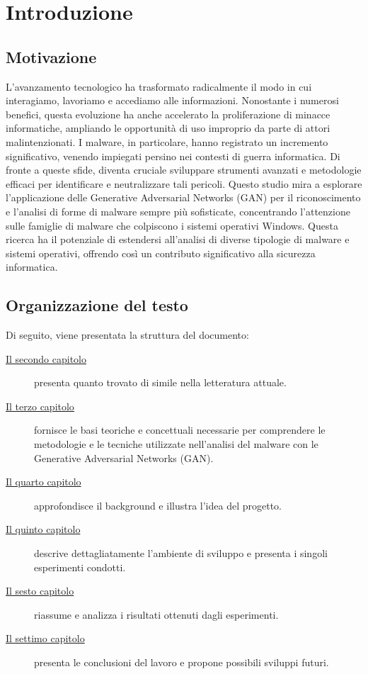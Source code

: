 \chapter{Introduzione}
\label{cap:introduzione}

\section{Motivazione}
L'avanzamento tecnologico ha trasformato radicalmente il modo in cui interagiamo, lavoriamo e accediamo alle informazioni. Nonostante i numerosi benefici, questa evoluzione ha anche accelerato la proliferazione di minacce informatiche, ampliando le opportunità di uso improprio da parte di attori malintenzionati. I malware, in particolare, hanno registrato un incremento significativo, venendo impiegati persino nei contesti di guerra informatica.
Di fronte a queste sfide, diventa cruciale sviluppare strumenti avanzati e metodologie efficaci per identificare e neutralizzare tali pericoli. Questo studio mira a esplorare l'applicazione delle Generative Adversarial Networks (GAN) per il riconoscimento e l'analisi di forme di malware sempre più sofisticate, concentrando l'attenzione sulle famiglie di malware che colpiscono i sistemi operativi Windows. Questa ricerca ha il potenziale di estendersi all'analisi di diverse tipologie di malware e sistemi operativi, offrendo così un contributo significativo alla sicurezza informatica.


\section{Organizzazione del testo}
\indent Di seguito, viene presentata la struttura del documento:
\begin{description}
    \item[{\hyperref[cap:RelatedWorks]{Il secondo capitolo}}] presenta quanto trovato di simile nella letteratura attuale.

    \item[{\hyperref[cap:background]{Il terzo capitolo}}] fornisce le basi teoriche e concettuali necessarie per comprendere le metodologie e le tecniche utilizzate nell'analisi del malware con le Generative Adversarial Networks (GAN).

    \item[{\hyperref[cap:descrizione]{Il quarto capitolo}}] approfondisce il background e illustra l'idea del progetto.
    
    \item[{\hyperref[cap:processi-metodologie]{Il quinto capitolo}}] descrive dettagliatamente l'ambiente di sviluppo e presenta i singoli esperimenti condotti.

    \item[{\hyperref[cap:risultati]{Il sesto capitolo}}] riassume e analizza i risultati ottenuti dagli esperimenti.
    
    \item[{\hyperref[cap:conclusioni]{Il settimo capitolo}}] presenta le conclusioni del lavoro e propone possibili sviluppi futuri.
\end{description}
